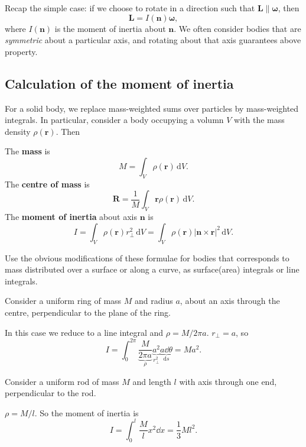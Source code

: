 Recap the simple case: if we choose to rotate in a direction such that $ \mathbf{L}\parallel \boldsymbol\omega $, then 
\[
    \mathbf{L} = I(\mathbf{n}) \boldsymbol{\omega},
\]
where $ I(\mathbf{n}) $ is the moment of inertia about $\mathbf{n}$. We often consider bodies that are \textit{symmetric} about a particular axis, and rotating about that axis guarantees above property. 

\subsection{Calculation of the moment of inertia}
For a solid body, we replace mass-weighted sums over particles by mass-weighted integrals. In particular, consider a body occupying a volumn $V$ with the mass density $\rho(\mathbf{r})$. Then 
\begin{definition}
    The \textbf{mass} is
    \[
      M = \int_V \rho(\mathbf{r}) \,\mathrm{d} V.
    \]
    The \textbf{centre of mass} is
    \[
      \mathbf{R} = \frac{1}{M}\int_V \mathbf{r}\rho(\mathbf{r})\,\mathrm{d} V.
    \]
    The \textbf{moment of inertia} about axis $\mathbf{n}$ is
    \[
      I = \int_V \rho(\mathbf{r}) r_{\perp}^2 \,\mathrm{d} V = \int_V \rho(\mathbf{r})|\mathbf{n}\times \mathbf{r}|^2\,\mathrm{d} V.
    \]
\end{definition}
Use the obvious modifications of these formulae for bodies that corresponds to mass distributed over a surface or along a curve, as surface(area) integrals or line integrals.

\begin{example}
    Consider a uniform ring of mass $M$ and radius $a$, about an axis through the centre, perpendicular to the plane of the ring.
    \begin{center}
    \end{center}
    In this case we reduce to a line integral and $ \rho = M/2\pi a $. $ r_{\perp }=a $, so 
    \[
      I = \int_{0}^{2\pi} \underbrace{\frac{M}{2\pi a}}_{\rho} \underbrace{a^2}_{r_{\perp}^2} \underbrace{a \dd \theta}_{\mathrm{d} s}= Ma^2.
    \]
\end{example}

\begin{example}
    Consider a uniform rod of mass $M$ and length $l$ with axis through one end, perpendicular to the rod.
    \begin{center}
    \end{center}
    $\rho = M/l$. So the moment of inertia is
    \[
      I = \int_0 ^l \frac{M}{l}x^2\dd x = \frac{1}{3}Ml^2.
    \]
\end{example}

